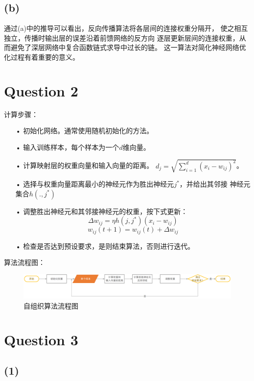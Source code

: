 \documentclass{article}
\newcommand{\question}[1]{\section*{Question #1}}
\renewcommand{\part}[1]{\subsection*{(#1)}}
\begin{document}
\part{b}
通过(a)中的推导可以看出，反向传播算法将各层间的连接权重分隔开，
使之相互独立，传播时输出层的误差沿着前馈网络的反方向
逐层更新层间的连接权重，从而避免了深层网络中复合函数链式求导中过长的链。
这一算法对简化神经网络优化过程有着重要的意义。

\question{2}
计算步骤：
\begin{itemize}
	\item[•] 初始化网络。通常使用随机初始化的方法。
	\item[•] 输入训练样本，每个样本为一个$d$维向量。
	\item[•] 计算映射层的权重向量和输入向量的距离。
		${d_j} = \sqrt {\sum\limits_{i = 1}^d {{{\left( {{x_i} - {w_{ij}}} \right)}^2}} } $。
	\item[•] 选择与权重向量距离最小的神经元作为胜出神经元${j^*}$，并给出其邻接
		神经元集合$h\left( {.,{j^*}} \right)$
	\item[•] 调整胜出神经元和其邻接神经元的权重，按下式更新：
	$$\Delta {w_{ij}} = \eta h\left( {j,{j^*}} \right)\left( {{x_i} - {w_{ij}}} \right)$$
	$${w_{ij}}\left( {t + 1} \right) = {w_{ij}}\left( t \right) + \Delta {w_{ij}}$$
	\item[•] 检查是否达到预设要求，是则结束算法，否则进行迭代。
\end{itemize}

算法流程图：
\begin{figure}[ht]
	\centering
	\includegraphics[width=1\textwidth]{Figure_2.png}
	\caption{自组织算法流程图}
	\label{figl}
\end{figure}

\question{3}
\part{1}
\end{document}
